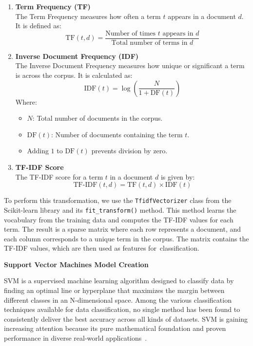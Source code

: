 \begin{enumerate}
    \item \textbf{Term Frequency (TF)} \\
    The Term Frequency measures how often a term \( t \) appears in a document \( d \). It is defined as:
    \[
    \text{TF}(t, d) = \frac{\text{Number of times } t \text{ appears in } d}{\text{Total number of terms in } d}
    \]
\newpage
    \item \textbf{Inverse Document Frequency (IDF)} \\
    The Inverse Document Frequency measures how unique or significant a term is across the corpus. It is calculated as:
    \[
    \text{IDF}(t) = \log\left(\frac{N}{1 + \text{DF}(t)}\right)
    \]
    Where:
    \begin{itemize}
        \item \( N \): Total number of documents in the corpus.
        \item \( \text{DF}(t) \): Number of documents containing the term \( t \).
        \item Adding \( 1 \) to \( \text{DF}(t) \) prevents division by zero.
    \end{itemize}

    \item \textbf{TF-IDF Score} \\
    The TF-IDF score for a term \( t \) in a document \( d \) is given by:
    \[
    \text{TF-IDF}(t, d) = \text{TF}(t, d) \times \text{IDF}(t)
    \]
\end{enumerate}


\noindent To perform this transformation, we use the \texttt{TfidfVectorizer} class from the Scikit-learn library and its \texttt{fit\_transform()} method. This method learns the vocabulary from the training data and computes the TF-IDF values for each term. The result is a sparse matrix where each row represents a document, and each column corresponds to a unique term in the corpus. The matrix contains the TF-IDF values, which are then used as features for~classification.

\vspace{3mm} 

\textbf{\large Support Vector Machines Model Creation}

\vspace{3mm}

SVM is a supervised machine learning algorithm designed to classify data by finding an optimal line or hyperplane that maximizes the margin between different classes in an N-dimensional space. Among the various classification techniques available for data classification, no single method has been found to consistently deliver the best accuracy across all kinds of datasets. SVM is gaining increasing attention because its pure mathematical foundation and proven performance in diverse real-world applications~\cite{chandra2021survey}.

